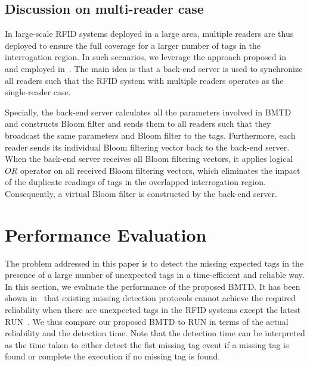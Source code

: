 \documentclass[10pt, twocolumn]{IEEEtran}
\begin{document}
\begin{comment}
Following~\eqref{Eq:P_system}, we have the observed protocol reliability, denoted by $\hat P_{sys}$, as follows:
\begin{equation}
\hat P_{sys}=1- \hat P^{MW}_{2,w}.
\end{equation}
If $\hat P_{sys}<\alpha$, the reader will automatically add one more round in Phase $\mathbf{II}$ to further detect the missing tag event until $\hat P_{sys} \ge \alpha$.

\end{comment}

\subsection{Discussion on multi-reader case}


In large-scale RFID systems deployed in a large area, multiple readers are thus deployed to ensure the full coverage for a larger number of tags in the interrogation region. In such scenarios, we leverage the approach proposed in~\cite{kodialam2007anonymous} and employed in~\cite{shahzad2015expecting}.
The main idea is that a back-end server is used to synchronize all readers such that the RFID system with multiple readers operates as the single-reader case.

Specially, the back-end server calculates all the parameters involved in BMTD and constructs Bloom filter and sends them to all readers such that they broadcast the same parameters and Bloom filter to the tags. Furthermore,
each reader sends its individual Bloom filtering vector back to the back-end server. When the back-end server receives all Bloom filtering vectors, it applies logical $OR$ operator on all received Bloom filtering vectors, which eliminates the impact of the duplicate readings of tags in the overlapped interrogation region. Consequently, a virtual Bloom filter is constructed by the back-end server.

\section{Performance Evaluation}
\label{sec:simulation}

The problem addressed in this paper is to detect the missing expected tags in the presence of a large number of unexpected tags in a time-efficient and reliable way. In this section, we evaluate the performance of the proposed BMTD. It has been shown in~\cite{shahzad2015expecting} that existing missing detection protocols cannot achieve the required reliability when there are unexpected tags in the RFID systems except the latest RUN~\cite{shahzad2015expecting}. We thus compare our proposed BMTD to RUN in terms of the actual reliability and the detection time. Note that the detection time can be interpreted as the time taken to either detect the fist missing tag event if a missing tag is found or complete the execution if no missing tag is found.
\end{document}
